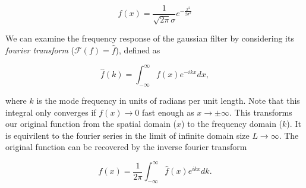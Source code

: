 \documentclass[11pt,a4paper,noindent]{article}
\begin{document}
\begin{equation}
f(x) = \frac{1}{\sqrt{2 \pi} \sigma} e^{-\frac{x^2}{2\sigma^2}}
\end{equation}

We can examine the frequency response of the gaussian filter by considering its \emph{fourier transform} ($\mathcal{F}(f) = \hat{f}$), defined as

\begin{equation}
\hat{f}(k) = \int_{-\infty}^{\infty} f(x) e^{-ikx} dx,
\end{equation}

where $k$ is the mode frequency in units of radians per unit length. Note that this integral only converges if $f(x) \rightarrow 0$ fast enough as $x \rightarrow  \pm \infty$. This transforms our original function from the spatial domain ($x$) to the frequency domain ($k$). It is equivilent to the fourier series in the limit of infinite domain size $L \rightarrow \infty$. The original function can be recovered by the inverse fourier transform

\begin{equation}
f(x) = \frac{1}{2\pi} \int_{-\infty}^{\infty} \hat{f}(x) e^{ikx} dk.
\end{equation}
\end{document}
